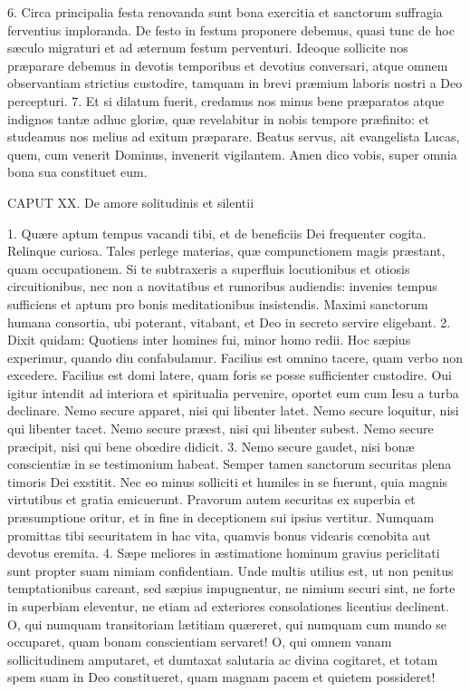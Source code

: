 6. Circa principalia festa renovanda sunt bona exercitia et sanctorum suffragia ferventius imploranda. De festo in festum proponere debemus, quasi tunc de hoc sæculo migraturi et ad æternum festum perventuri. Ideoque sollicite nos præparare debemus in devotis temporibus et devotius conversari, atque omnem observantiam strictius custodire, tamquam in brevi præmium laboris nostri a Deo percepturi.
7. Et si dilatum fuerit, credamus nos minus bene præparatos atque indignos tantæ adhuc gloriæ, quæ revelabitur in nobis tempore præfinito: et studeamus nos melius ad exitum præparare. Beatus servus, ait evangelista Lucas, quem, cum venerit Dominus, invenerit vigilantem. Amen dico vobis, super omnia bona sua constituet eum.


CAPUT XX.
De amore solitudinis et silentii

1. Quære aptum tempus vacandi tibi, et de beneficiis Dei frequenter cogita. Relinque curiosa. Tales perlege materias, quæ compunctionem magis præstant, quam occupationem. Si te subtraxeris a superfluis locutionibus et otiosis circuitionibus, nec non a novitatibus et rumoribus audiendis: invenies tempus sufficiens et aptum pro bonis meditationibus insistendis. Maximi sanctorum humana consortia, ubi poterant, vitabant, et Deo in secreto servire eligebant.
2. Dixit quidam: Quotiens inter homines fui, minor homo redii. Hoc sæpius experimur, quando diu confabulamur. Facilius est omnino tacere, quam verbo non excedere. Facilius est domi latere, quam foris se posse sufficienter custodire. Oui igitur intendit ad interiora et spiritualia pervenire, oportet eum cum Iesu a turba declinare. Nemo secure apparet, nisi qui libenter latet. Nemo secure loquitur, nisi qui libenter tacet. Nemo secure præest, nisi qui libenter subest. Nemo secure præcipit, nisi qui bene obœdire didicit.
3. Nemo secure gaudet, nisi bonæ conscientiæ in se testimonium habeat. Semper tamen sanctorum securitas plena timoris Dei exstitit. Nec eo minus solliciti et humiles in se fuerunt, quia magnis virtutibus et gratia emicuerunt. Pravorum autem securitas ex superbia et præsumptione oritur, et in fine in deceptionem sui ipsius vertitur. Numquam promittas tibi securitatem in hac vita, quamvis bonus videaris cœnobita aut devotus eremita.
4. Sæpe meliores in æstimatione hominum gravius periclitati sunt propter suam nimiam confidentiam. Unde multis utilius est, ut non penitus temptationibus careant, sed sæpius impugnentur, ne nimium securi sint, ne forte in superbiam eleventur, ne etiam ad exteriores consolationes licentius declinent. O, qui numquam transitoriam lætitiam quæreret, qui numquam cum mundo se occuparet, quam bonam conscientiam servaret! O, qui omnem vanam sollicitudinem amputaret, et dumtaxat salutaria ac divina cogitaret, et totam spem suam in Deo constitueret, quam magnam pacem et quietem possideret!
